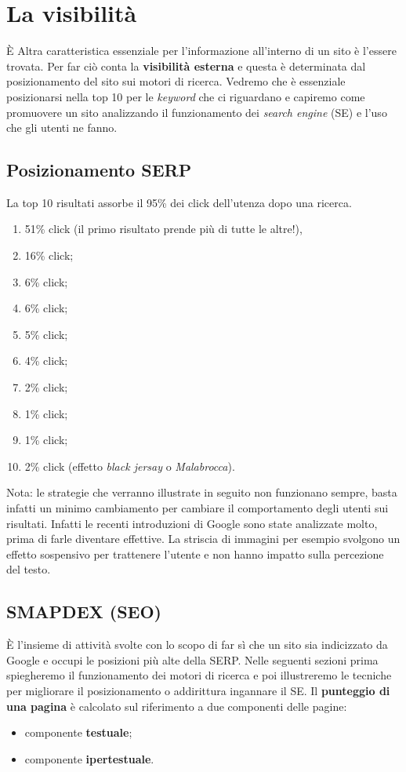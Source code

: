 
\chapter{La visibilità}

È	Altra caratteristica essenziale per l'informazione all'interno di un sito è l'essere trovata. Per far ciò conta la \textbf{visibilità esterna} e questa è determinata dal posizionamento del sito sui motori di ricerca. 
	Vedremo che è essenziale posizionarsi nella top 10 per le \emph{keyword} che ci riguardano e capiremo come promuovere un sito analizzando il funzionamento dei \emph{search engine} (SE) e l'uso che gli utenti ne fanno.

	\section{Posizionamento SERP}	
		La top 10 risultati assorbe il 95\% dei click dell'utenza dopo una ricerca.
		\begin{enumerate}
			\item 51\% click (il primo risultato prende più di tutte le altre!),
			\item 16\% click;
			\item 6\% click;
			\item 6\% click;
			\item 5\% click;
			\item 4\% click;
			\item 2\% click;
			\item 1\% click;
			\item 1\% click;
			\item 2\% click (effetto \emph{black jersay} o \emph{Malabrocca}).		
		\end{enumerate}
		
		Nota: le strategie che verranno illustrate in seguito non funzionano sempre, basta infatti un minimo cambiamento per cambiare il comportamento degli utenti sui risultati. Infatti le recenti introduzioni di Google sono state analizzate molto, prima di farle diventare effettive. La striscia di immagini per esempio svolgono un effetto sospensivo per trattenere l'utente e non hanno impatto sulla percezione del testo.
	
	\section{SMAPDEX (SEO)}
		È l'insieme di attività svolte con lo scopo di far sì che un sito sia indicizzato da Google e occupi le posizioni più alte della SERP. Nelle seguenti sezioni prima spiegheremo il funzionamento dei motori di ricerca e poi illustreremo le tecniche per migliorare il posizionamento o addirittura ingannare il SE.
		Il \textbf{punteggio di una pagina} è calcolato sul riferimento a due componenti delle pagine:
		\begin{itemize}
			\item componente \textbf{testuale};
			\item componente \textbf{ipertestuale}.
		\end{itemize}
		
